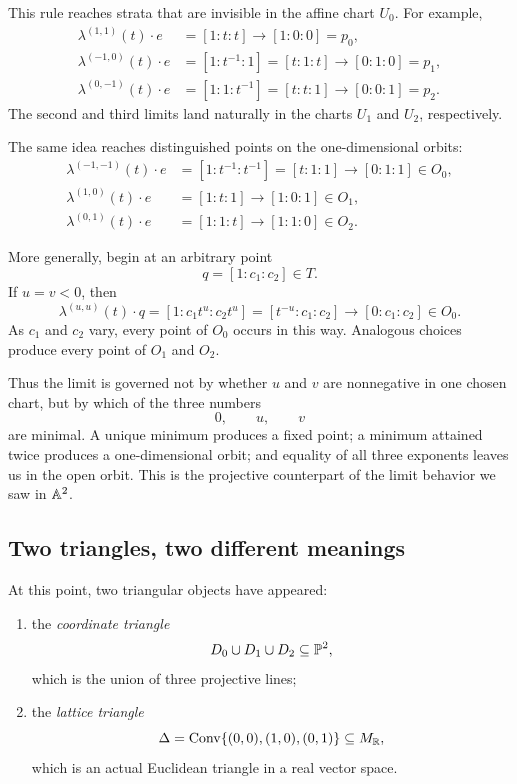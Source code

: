 This rule reaches strata that are invisible in the affine chart
\(U_0\). For example,
\[
\begin{aligned}
\lambda^{(1,1)}(t)\cdot e
&=[1:t:t]
  \longrightarrow [1:0:0]=p_0,
\\
\lambda^{(-1,0)}(t)\cdot e
&=[1:t^{-1}:1]
 =[t:1:t]
  \longrightarrow [0:1:0]=p_1,
\\
\lambda^{(0,-1)}(t)\cdot e
&=[1:1:t^{-1}]
 =[t:t:1]
  \longrightarrow [0:0:1]=p_2.
\end{aligned}
\]
The second and third limits land naturally in the charts \(U_1\) and
\(U_2\), respectively.

The same idea reaches distinguished points on the
one-dimensional orbits:
\[
\begin{aligned}
\lambda^{(-1,-1)}(t)\cdot e
&=[1:t^{-1}:t^{-1}]
 =[t:1:1]
  \longrightarrow [0:1:1]\in O_0,
\\
\lambda^{(1,0)}(t)\cdot e
&=[1:t:1]
  \longrightarrow [1:0:1]\in O_1,
\\
\lambda^{(0,1)}(t)\cdot e
&=[1:1:t]
  \longrightarrow [1:1:0]\in O_2.
\end{aligned}
\]

More generally, begin at an arbitrary point
\[
q=[1:c_1:c_2]\in T.
\]
If \(u=v<0\), then
\[
\lambda^{(u,u)}(t)\cdot q
=
[1:c_1t^u:c_2t^u]
=
[t^{-u}:c_1:c_2]
\longrightarrow
[0:c_1:c_2]\in O_0.
\]
As \(c_1\) and \(c_2\) vary, every point of \(O_0\) occurs in this
way. Analogous choices produce every point of \(O_1\) and \(O_2\).

Thus the limit is governed not by whether \(u\) and \(v\) are
nonnegative in one chosen chart, but by which of the three numbers
\[
0,\qquad u,\qquad v
\]
are minimal. A unique minimum produces a fixed point; a minimum
attained twice produces a one-dimensional orbit; and equality of all
three exponents leaves us in the open orbit. This is the projective
counterpart of the limit behavior we saw in \(\mathbb{A}^2\).

\subsection{Two triangles, two different meanings}

At this point, two triangular objects have appeared:

\begin{enumerate}
\item the \emph{coordinate triangle}
\[
D_0\cup D_1\cup D_2\subseteq\mathbb{P}^2,
\]
which is the union of three projective lines;

\item the \emph{lattice triangle}
\[
\Delta
=
\operatorname{Conv}\{(0,0),(1,0),(0,1)\}
\subseteq M_{\mathbb{R}},
\]
which is an actual Euclidean triangle in a real vector space.
\end{enumerate}

